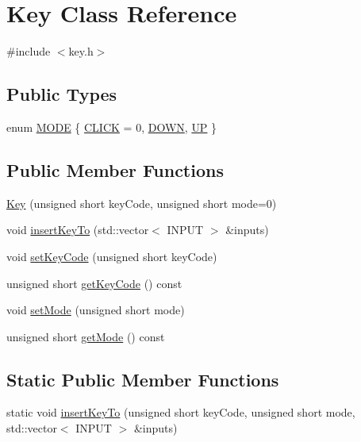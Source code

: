 \hypertarget{class_key}{\section{Key Class Reference}
\label{class_key}
}


{\ttfamily \#include $<$key.\-h$>$}

\subsection*{Public Types}
\begin{DoxyCompactItemize}
\item 
enum \hyperlink{class_key_a6f8c4beba5584878553ee5b3077be416}{M\-O\-D\-E} \{ \hyperlink{class_key_a6f8c4beba5584878553ee5b3077be416a921a98871b9bca60fb5abbfb2cbaa4dd}{C\-L\-I\-C\-K} =  0, 
\hyperlink{class_key_a6f8c4beba5584878553ee5b3077be416ab0381f960318045ea8221f73863fd499}{D\-O\-W\-N}, 
\hyperlink{class_key_a6f8c4beba5584878553ee5b3077be416a94528a9df1ce9f0789fb5e33780424f1}{U\-P}
 \}
\end{DoxyCompactItemize}
\subsection*{Public Member Functions}
\begin{DoxyCompactItemize}
\item 
\hyperlink{class_key_a26feef290360ca3bba9b5bb6831de445}{Key} (unsigned short key\-Code, unsigned short mode=0)
\item 
void \hyperlink{class_key_ab3097a0cdb61e5e7c1e2f3cba6746a37}{insert\-Key\-To} (std\-::vector$<$ I\-N\-P\-U\-T $>$ \&inputs)
\item 
void \hyperlink{class_key_a2586bfede14e2f7ccc0faf07ec1b6841}{set\-Key\-Code} (unsigned short key\-Code)
\item 
unsigned short \hyperlink{class_key_a0acebcc2e10270c2f31c1c5f96395fa7}{get\-Key\-Code} () const 
\item 
void \hyperlink{class_key_a87cab00dc5a5e7490e62d48f0560085e}{set\-Mode} (unsigned short mode)
\item 
unsigned short \hyperlink{class_key_a3c6d49b9f94672a8e17ebf9f37ad3900}{get\-Mode} () const 
\end{DoxyCompactItemize}
\subsection*{Static Public Member Functions}
\begin{DoxyCompactItemize}
\item 
static void \hyperlink{class_key_a4e99bf27b8920e8e16f27691efedf9ba}{insert\-Key\-To} (unsigned short key\-Code, unsigned short mode, std\-::vector$<$ I\-N\-P\-U\-T $>$ \&inputs)
\end{DoxyCompactItemize}
